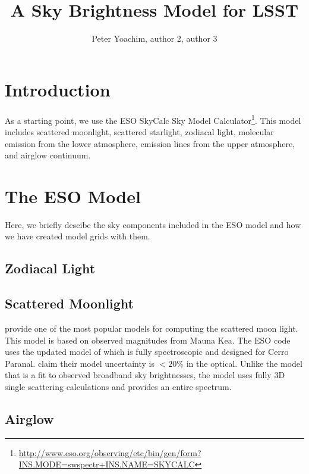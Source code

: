 \documentclass{emulateapj}  %
\begin{document}
\title{A Sky Brightness Model for LSST}


\author{Peter Yoachim, author 2, author 3}


\begin{abstract}

\end{abstract}


\section{Introduction}

As a starting point, we use the ESO SkyCalc Sky Model Calculator\footnote{\url{http://www.eso.org/observing/etc/bin/gen/form?INS.MODE=swspectr+INS.NAME=SKYCALC}}.  This model includes scattered moonlight, scattered starlight, zodiacal light, molecular emission from the lower atmosphere, emission lines from the upper atmosphere, and airglow continuum.  


\section{The ESO Model}
Here, we briefly descibe the sky components included in the ESO model and how we have created model grids with them.
\subsection{Zodiacal Light}


\subsection{Scattered Moonlight}

\citet{Krisciunas91} provide one of the most popular models for computing the scattered moon light. This model is based on observed magnitudes from Mauna Kea. The ESO code uses the updated model of \citet{Jones13} which is fully spectroscopic and designed for Cerro Paranal. \citet{Jones13} claim their model uncertainty is $<20$\% in the optical.  Unlike the \citet{Krisciunas91} model that is a fit to observed broadband sky brightnesses, the \citet{Jones13} model uses fully 3D single scattering calculations and provides an entire spectrum.

\citet{Noll12}


\subsection{Airglow}
\end{document}

